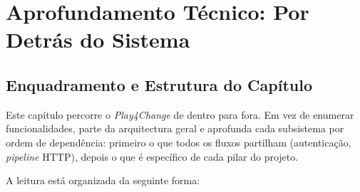 %
%
%
\chapter{Aprofundamento Técnico: Por Detrás do Sistema}
\label{cha:deepdive}

\section{Enquadramento e Estrutura do Capítulo}
\label{sec:enquadramento}

Este capítulo percorre o \textit{Play4Change} de dentro para fora.
Em vez de enumerar funcionalidades, parte da arquitectura geral e aprofunda
cada subsistema por ordem de dependência: primeiro o que todos os fluxos
partilham (autenticação, \textit{pipeline} HTTP), depois o que é específico
de cada pilar do projeto.

A leitura está organizada da seguinte forma:

